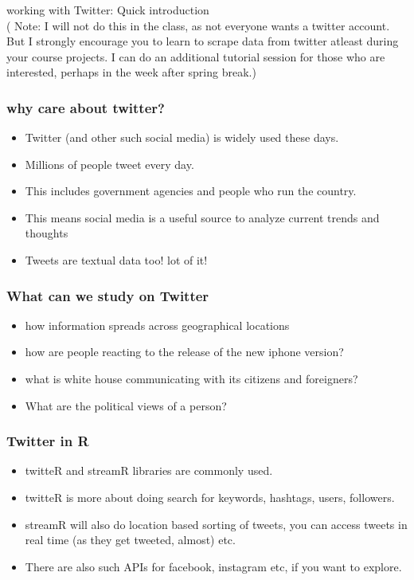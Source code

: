 \documentclass{beamer}
\begin{document}
\begin{frame}
\frametitle{}
\Large working with Twitter: Quick introduction
\\ \scriptsize ( Note: I will not do this in the class, as not everyone wants a twitter account. But I strongly encourage you to learn to scrape data from twitter atleast during your course projects. I can do an additional tutorial session for those who are interested, perhaps in the week after spring break.)

\end{frame}

\begin{frame}
\frametitle{why care about twitter?}
\begin{itemize}
\item Twitter (and other such social media) is widely used these days.
\item Millions of people tweet every day.
\item This includes government agencies and people who run the country.
\item This means social media is a useful source to analyze current trends and thoughts
\item Tweets are textual data too! lot of it!
\end{itemize}
\end{frame}

\begin{frame}
\frametitle{What can we study on Twitter}
\begin{itemize}
\item how information spreads across geographical locations
\item how are people reacting to the release of the new iphone version?
\item what is white house communicating with its citizens and foreigners?
\item What are the political views of a person?
\end{itemize}
\end{frame}

\begin{frame}
\frametitle{Twitter in R}
\begin{itemize}
\item twitteR and streamR libraries are commonly used.
\item twitteR is more about doing search for keywords, hashtags, users, followers.
\item streamR will also do location based sorting of tweets, you can access tweets in real time (as they get tweeted, almost) etc.
\item There are also such APIs for facebook, instagram etc, if you want to explore.
\end{itemize}
\end{frame}
\end{document}
